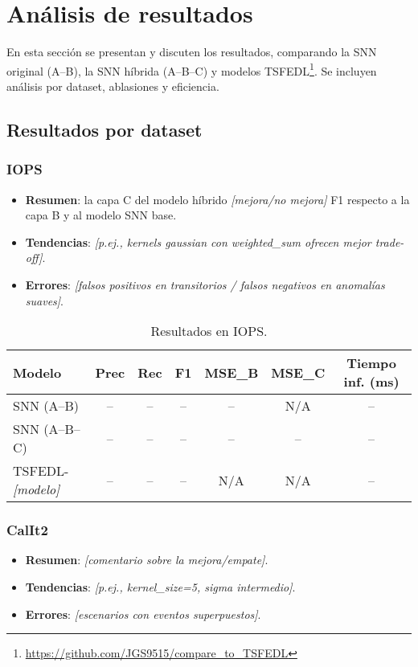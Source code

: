 \section{Análisis de resultados}

En esta sección se presentan y discuten los resultados, comparando la SNN original (A--B), la SNN híbrida (A--B--C) y modelos TSFEDL\footnote{\url{https://github.com/JGS9515/compare_to_TSFEDL}}. Se incluyen análisis por dataset, ablasiones y eficiencia.

\subsection{Resultados por dataset}

\subsubsection{IOPS}
\begin{itemize}
    \item \textbf{Resumen}: la capa C del modelo híbrido \textit{[mejora/no mejora]} F1 respecto a la capa B y al modelo SNN base.
    \item \textbf{Tendencias}: \textit{[p.ej., kernels gaussian con weighted\_sum ofrecen mejor trade-off]}.
    \item \textbf{Errores}: \textit{[falsos positivos en transitorios / falsos negativos en anomalías suaves]}.
\end{itemize}

\begin{table}[htbp]
\centering
\small
\begin{tabular}{lcccccc}
\hline\hline
\textbf{Modelo} & \textbf{Prec} & \textbf{Rec} & \textbf{F1} & \textbf{MSE\_B} & \textbf{MSE\_C} & \textbf{Tiempo inf. (ms)} \\
\hline
SNN (A--B) & -- & -- & -- & -- & N/A & -- \\
SNN (A--B--C) & -- & -- & -- & -- & -- & -- \\
TSFEDL-\textit{[modelo]} & -- & -- & -- & N/A & N/A & -- \\
\hline\hline
\end{tabular}
\caption{Resultados en IOPS.}
\label{tab:resultados-iops}
\end{table}

\subsubsection{CalIt2}
\begin{itemize}
    \item \textbf{Resumen}: \textit{[comentario sobre la mejora/empate]}.
    \item \textbf{Tendencias}: \textit{[p.ej., kernel\_size=5, sigma intermedio]}.
    \item \textbf{Errores}: \textit{[escenarios con eventos superpuestos]}.
\end{itemize}

